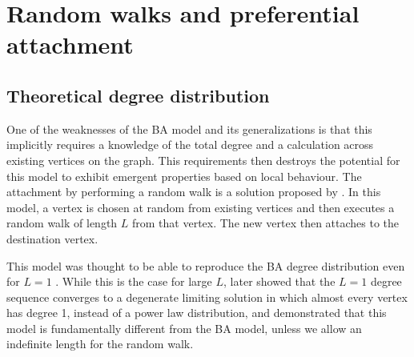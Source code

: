 \section{Random walks and preferential attachment}\label{section:random-walk}

\subsection{Theoretical degree distribution}
One of the weaknesses of the BA model and its generalizations is that this implicitly requires a knowledge of the total degree and a calculation across existing vertices on the graph. This requirements then destroys the potential for this model to exhibit emergent properties based on local behaviour. The attachment by performing a random walk is a solution proposed by \citet{Saramaki2004}. In this model, a vertex is chosen at random from existing vertices and then executes a random walk of length $L$ from that vertex. The new vertex then attaches to the destination vertex. 

This model was thought to be able to reproduce the BA degree distribution even for $L=1$ \citep{Saramaki2004,J.P.Saramaki2004}. While this is the case for large $L$, \citet{Cannings2013} later showed that the $L=1$ degree sequence converges to a degenerate limiting solution in which almost every vertex has degree 1, instead of a power law distribution, and demonstrated that this model is fundamentally different from the BA model, unless we allow an indefinite length for the random walk. 

